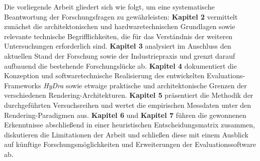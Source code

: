 Die vorliegende Arbeit gliedert sich wie folgt, um eine systematische Beantwortung der Forschungsfragen zu
gewährleisten:
\textbf{Kapitel 2} vermittelt zunächst die architektonischen und hardwaretechnischen Grundlagen sowie relevante
technische Begrifflichkeiten, die für das Verständnis der weiteren Untersuchungen erforderlich sind.
\textbf{Kapitel 3} analysiert im Anschluss den aktuellen Stand der Forschung sowie der Industriepraxis und grenzt darauf
aufbauend die bestehende Forschungslücke ab.
\textbf{Kapitel 4} dokumentiert die Konzeption und softwaretechnische Realisierung des entwickelten
Evaluations-Frameworks \textit{HyDra} sowie etwaige praktische und architektonische Grenzen der verschiedenen
Rendering-Architekturen.
\textbf{Kapitel 5} präsentiert die Methodik der durchgeführten Versuchsreihen und wertet die
empirischen Messdaten unter den Rendering-Paradigmen aus.
\textbf{Kapitel 6} und \textbf{Kapitel 7} führen die gewonnenen Erkenntnisse abschließend in einer heuristischen
Entscheidungsmatrix zusammen, diskutieren die Limitationen der Arbeit und schließen diese mit einem Ausblick auf
künftige Forschungsmöglichkeiten und Erweiterungen der Evaluationssoftware ab.

